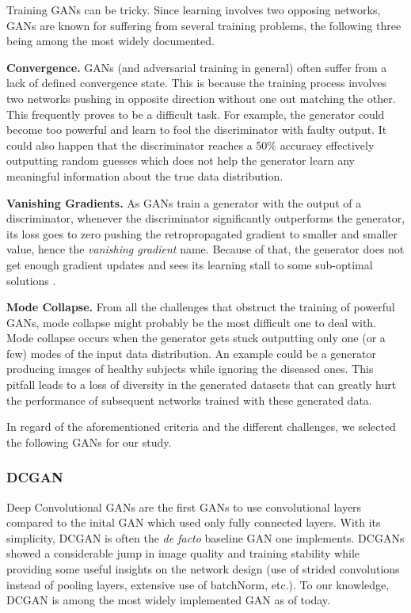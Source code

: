 \documentclass[preprint,12pt, authoryear]{elsarticle}
\begin{document}
Training GANs can be tricky. Since learning involves two opposing networks, GANs are known for suffering from several training problems, the following three being among the most widely documented.

\textbf{Convergence.}  GANs (and adversarial training in general) often suffer from a lack of defined convergence state.  This is because the training process involves two networks pushing in opposite direction without one out matching the other. This frequently proves to be a difficult task. For example, the generator could become too powerful and learn to fool the discriminator with faulty output.  It could also happen that the discriminator reaches a 50\% accuracy effectively outputting random guesses which does not help the generator learn any meaningful information about the true data distribution.


\textbf{Vanishing Gradients.}  As GANs train a generator with the output of a discriminator, whenever the discriminator significantly outperforms the generator, its loss goes to zero pushing the retropropagated gradient to smaller and smaller value, hence the {\em vanishing gradient} name.  Because of that, the generator does not get enough gradient updates and sees its learning stall to some sub-optimal solutions \citep{Arjovsky2017TowardsPM}.


\textbf{Mode Collapse.}  From all the challenges that obstruct the training of powerful GANs, mode collapse might probably be the most difficult one to deal with.  Mode collapse occurs when the generator gets stuck outputting only one (or a few) modes of the input data distribution. An example could be a generator producing images of  healthy subjects while ignoring the diseased ones. This pitfall leads to a loss of diversity in the generated datasets that can greatly hurt the performance of subsequent networks trained with these generated data.



In regard of the aforementioned criteria and the different challenges, we selected the following GANs for our study.
\subsubsection{DCGAN} Deep Convolutional GANs \citep{Radford2016UnsupervisedRL} are the first GANs to use convolutional layers compared to the inital GAN which used only fully connected layers.  With its simplicity, DCGAN is often the {\em de facto} baseline GAN one implements.  DCGANs showed a considerable jump in image quality and training stability while providing some useful insights on the network design (use of strided convolutions instead of pooling layers, extensive use of batchNorm, etc.).  To our knowledge, DCGAN is among the most widely implemented GAN as of today.
\end{document}
